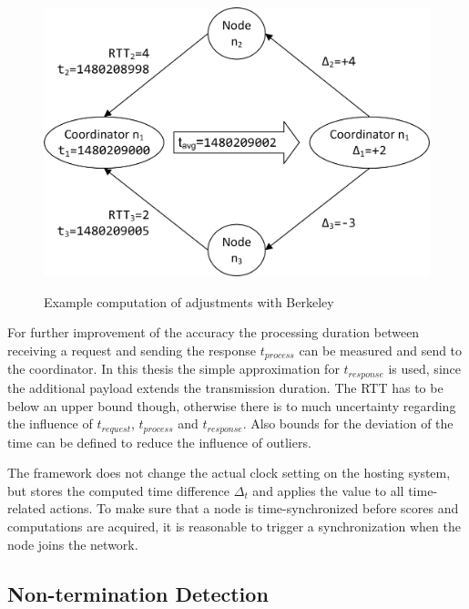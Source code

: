 		\begin{figure}[!htbp] %
			\caption{Example computation of adjustments with Berkeley}
			\includegraphics[scale=1.0]{figures/berkeley-example.png}
			\label{figure:berkeley example}
		\end{figure}
	
		 For further improvement of the accuracy the processing duration between receiving a request and sending the response $t_{process}$ can be measured and send to the coordinator. In this thesis the simple approximation for $t_{response}$ is used, since the additional payload extends the transmission duration. The \gls{RTT} has to be below an upper bound though, otherwise there is to much uncertainty regarding the influence of $t_{request}$, $t_{process}$ and $t_{response}$.
		 Also bounds for the deviation of the time can be defined to reduce the influence of outliers.
		 
		 The framework does not change the actual clock setting on the hosting system, but stores the computed time difference $\Delta_t$ and applies the value to all time-related actions. To make sure that a node is time-synchronized before scores and computations are acquired, it is reasonable to trigger a synchronization when the node joins the network. 
		 
		\FloatBarrier
		\subsection{Non-termination Detection}
		\label{Non-termination Detection}
		
